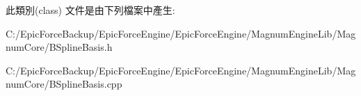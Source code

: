 此類別(class) 文件是由下列檔案中產生\+:\begin{DoxyCompactItemize}
\item 
C\+:/\+Epic\+Force\+Backup/\+Epic\+Force\+Engine/\+Epic\+Force\+Engine/\+Magnum\+Engine\+Lib/\+Magnum\+Core/B\+Spline\+Basis.\+h\item 
C\+:/\+Epic\+Force\+Backup/\+Epic\+Force\+Engine/\+Epic\+Force\+Engine/\+Magnum\+Engine\+Lib/\+Magnum\+Core/B\+Spline\+Basis.\+cpp\end{DoxyCompactItemize}
